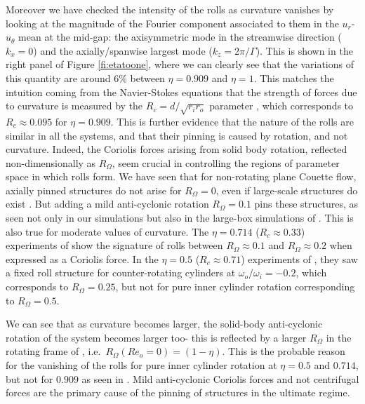 \documentclass{jfm}
\begin{document}
Moreover we have checked the intensity of the rolls as curvature vanishes by looking at the  magnitude of the Fourier component associated to them in the $u_r$-$u_\theta$ mean at the mid-gap: the axisymmetric mode in the streamwise direction ($k_x=0$) and the axially/spanwise largest mode ($k_z = 2 \pi/\Gamma$). This is shown in the right panel of Figure \ref{fi:etatoone}, where we can clearly see that the variations of this quantity are around $6\%$ between $\eta=0.909$ and $\eta=1$. This matches the intuition coming from the Navier-Stokes equations that the strength of forces due to curvature is measured by the $R_c=d/\sqrt{r_ir_o}$ parameter \citep{bra15}, which corresponds to $R_c\approx 0.095$ for $\eta=0.909$. This is further evidence that the nature of the rolls are similar in all the systems, and that their pinning is caused by rotation, and not curvature. Indeed, the Coriolis forces arising from solid body rotation, reflected non-dimensionally as $R_\Omega$, seem crucial in controlling the regions of parameter space in which rolls form. We have seen that for non-rotating plane Couette flow, axially pinned structures do not arise for $R_\Omega=0$, even if large-scale structures do exist \citep{avs14}. But adding a mild anti-cyclonic rotation $R_\Omega=0.1$ pins these structures, as seen not only in our simulations but also in the large-box simulations of \cite{tob17}. This is also true for moderate values of curvature. The $\eta=0.714$ ($R_c\approx 0.33$) experiments of \cite{hui14} show the signature of rolls between $R_\Omega \approx 0.1$ and $R_\Omega \approx 0.2$ when expressed as a Coriolis force. In the $\eta=0.5$ ($R_c\approx 0.71$) experiments of \cite{van16}, they saw a fixed roll structure for counter-rotating cylinders at $\omega_o/\omega_i=-0.2$, which corresponds to $R_\Omega=0.25$, but not for pure inner cylinder rotation corresponding to $R_\Omega=0.5$. 

We can see that as curvature becomes larger, the solid-body anti-cyclonic rotation of the system becomes larger too- this is reflected by a larger $R_\Omega$ in the rotating frame of \cite{dub05}, i.e.~$R_\Omega(Re_o=0)=(1-\eta)$. This is the probable reason for the vanishing of the rolls for pure inner cylinder rotation at $\eta=0.5$ and $0.714$, but not for $0.909$ as seen in \cite{ost14}. Mild anti-cyclonic Coriolis forces and not centrifugal forces are the primary cause of the pinning of structures in the ultimate regime. 
\end{document}
